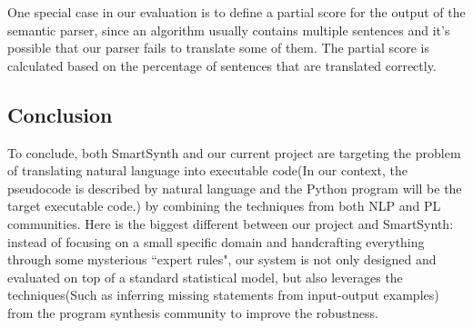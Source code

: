 \documentclass[10pt]{article}
\begin{document}
One special case in our evaluation is to define a partial score for the output 
of the semantic parser, since an algorithm usually contains multiple sentences 
and it's possible that our parser fails to translate some of them. The partial
score is calculated based on the percentage of sentences that are translated
correctly.  

\subsection{Conclusion}
To conclude, both SmartSynth and our current project are targeting the problem 
of translating natural language into executable code(In our context, the pseudocode
is described by natural language and the Python program will be the target
executable code.) by combining the techniques
from both NLP and PL communities. Here is the biggest different between our 
project and SmartSynth: instead of focusing on a small specific domain
and handcrafting everything through some mysterious ``expert rules", our system
is not only designed and evaluated on top of a standard statistical model, but also leverages
the techniques(Such as inferring missing statements from input-output examples) 
from the program synthesis community to improve the robustness.



\end{document}

